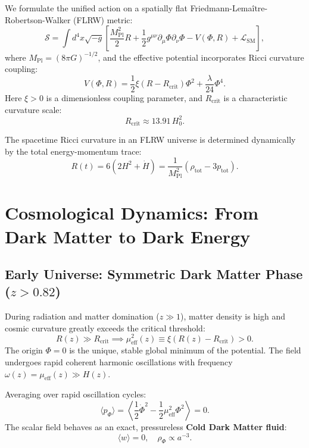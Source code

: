 \documentclass[aps,prd,twocolumn,superscriptaddress,nofootinbib,floatfix,longbibliography]{revtex4-2}
\begin{document}
We formulate the unified action on a spatially flat Friedmann-Lema\^itre-Robertson-Walker (FLRW) metric:
\begin{equation}
\mathcal{S} = \int d^4x \sqrt{-g} \left[ \frac{M_{\text{Pl}}^2}{2} R + \frac{1}{2} g^{\mu\nu} \partial_\mu \Phi \partial_\nu \Phi - V(\Phi, R) + \mathcal{L}_{\text{SM}} \right],
\end{equation}
where $M_{\text{Pl}} = (8\pi G)^{-1/2}$, and the effective potential incorporates Ricci curvature coupling:
\begin{equation}
V(\Phi, R) = \frac{1}{2} \xi (R - R_{\text{crit}}) \Phi^2 + \frac{\lambda}{24} \Phi^4.
\label{eq:pot}
\end{equation}
Here $\xi > 0$ is a dimensionless coupling parameter, and $R_{\text{crit}}$ is a characteristic curvature scale:
\begin{equation}
R_{\text{crit}} \approx 13.91 \, H_0^2.
\end{equation}

The spacetime Ricci curvature in an FLRW universe is determined dynamically by the total energy-momentum trace:
\begin{equation}
R(t) = 6 \left( 2H^2 + \dot{H} \right) = \frac{1}{M_{\text{Pl}}^2} (\rho_{\text{tot}} - 3 p_{\text{tot}}).
\end{equation}

\section{Cosmological Dynamics: From Dark Matter to Dark Energy}
\label{sec:dynamics}

\subsection{Early Universe: Symmetric Dark Matter Phase ($z > 0.82$)}
During radiation and matter domination ($z \gg 1$), matter density is high and cosmic curvature greatly exceeds the critical threshold:
\begin{equation}
R(z) \gg R_{\text{crit}} \implies \mu_{\text{eff}}^2(z) \equiv \xi (R(z) - R_{\text{crit}}) > 0.
\end{equation}
The origin $\Phi = 0$ is the unique, stable global minimum of the potential. The field undergoes rapid coherent harmonic oscillations with frequency $\omega(z) = \mu_{\text{eff}}(z) \gg H(z)$. 

Averaging over rapid oscillation cycles:
\begin{equation}
\langle p_\Phi \rangle = \left\langle \frac{1}{2} \dot{\Phi}^2 - \frac{1}{2} \mu_{\text{eff}}^2 \Phi^2 \right\rangle = 0.
\end{equation}
The scalar field behaves as an exact, pressureless \textbf{Cold Dark Matter fluid}:
\begin{equation}
\langle w \rangle = 0, \quad \rho_\Phi \propto a^{-3}.
\end{equation}
\end{document}
